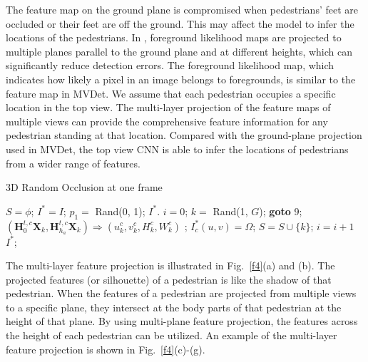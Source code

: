\documentclass[runningheads]{llncs}
\begin{document}
	The feature map on the ground plane is compromised when pedestrians' feet are occluded or their feet are off the ground. This may affect the model to infer the locations of the pedestrians. In \cite{khan2008tracking}, foreground likelihood maps are projected to multiple planes parallel to the ground plane and at different heights, which can significantly reduce detection errors. The foreground likelihood map, which indicates how likely a pixel in an image belongs to foregrounds, is similar to the feature map in MVDet. We assume that each pedestrian occupies a specific location in the top view. The multi-layer projection of the feature maps of multiple views can provide the comprehensive feature information for any pedestrian standing at that location. Compared with the ground-plane projection used in MVDet, the top view CNN is able to infer the locations of pedestrians from a wider range of features.
	\begin{center}
		\begin{minipage}[t]{10cm}
			\begin{algorithm}[H]
\caption{3D Random Occlusion at one frame}  \label{code:alg1}
				\DontPrintSemicolon
				$S = \phi $; \;
				$I^* = I$; \;
				$p_1 =$ Rand(0, 1); \;
				{
					\Return $I^*$.
				}
				\Else
				{ $i = 0$; \;
					{
						$k =$ Rand(1, $G$); \;
						{
							\textbf{goto} 9; \;
						}
						\Else
						{
							{
								$(\textbf{H}^{t,c}_{0}\textbf{X}_k,\textbf{H}^{t,c}_{h_a}\textbf{X}_k)\Rightarrow (u^c_k,v^c_k,H^c_k,W^c_k)$ ; \;
								{
									{
										$I^*_c(u, v) = \Omega$;\;
									}
								}
							}
							$S = S \cup \{k\}$;\;
							$i = i + 1$
						}
					}
					\Return $I^*$; \;}
\end{algorithm}
		\end{minipage}
	\end{center}
	
	The multi-layer feature projection is illustrated in Fig.~\ref{f4}(a) and (b). The projected features (or silhouette) of a pedestrian is like the shadow of that pedestrian. When the features of a pedestrian are projected from multiple views to a specific plane, they intersect at the body parts of that pedestrian at the height of that plane. By using multi-plane feature projection, the features across the height of each pedestrian can be utilized.
	An example of the multi-layer feature projection is shown in Fig.~\ref{f4}(c)-(g).
	
\end{document}
